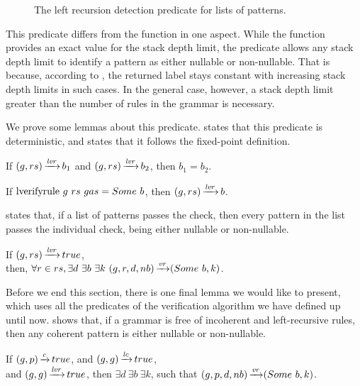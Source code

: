 \begin{figure}
    \centering
    
    \caption{The left recursion detection predicate for lists of patterns.}
    \label{fig:lverifyrule}
\end{figure}

This predicate differs from the function in one aspect.
While the function provides an exact value for the
stack depth limit, the predicate allows any stack depth limit
to identify a pattern as either nullable or non-nullable.
That is because, according to ,
the returned label stays constant with increasing stack depth limits in such cases.
In the general case, however,
a stack depth limit greater than
the number of rules in the grammar
is necessary.

We prove some lemmas about this predicate.
states that this predicate is deterministic,
and 
states that it follows the fixed-point definition.

\begin{lemma}
    If $(g,rs) \operatorname{\xrightarrow{\mathit{lvr}}} b_1$
    and $(g,rs) \operatorname{\xrightarrow{\mathit{lvr}}} b_2$,
    then $b_1 = b_2$.
    \label{lemma:lverifyrule-determinism}
\end{lemma}

\begin{lemma}
    If $\text{lverifyrule}{}\ g\ rs\ gas = Some\ b$,
    then $(g,rs) \operatorname{\xrightarrow{\mathit{lvr}}} b$.
    \label{lemma:lverifyrule-follows}
\end{lemma}

 states that,
if a list of patterns passes the check,
then every pattern in the list
passes the individual check,
being either nullable or non-nullable.

\begin{lemma}%
    If $(g,rs) \operatorname{\xrightarrow{\mathit{lvr}}} true$, \\
    then, $\forall r \in rs, \exists d\ \exists b\ \exists k\ \VerifyRule{g}{r}{d}{nb}{\Some b}{k}$.
    \label{lemma:lverifyrule-safety}
\end{lemma}

Before we end this section,
there is one final lemma we would like to present,
which uses all the predicates of the verification algorithm
we have defined up until now.
 shows that,
if a grammar is free of incoherent and left-recursive rules,
then any coherent pattern is either nullable or non-nullable.

\begin{lemma}%
    If $(g,p) \operatorname{\xrightarrow{\mathit{c}}} true$,
    and $(g,g) \operatorname{\xrightarrow{\mathit{lc}}} true$, \\
    and $(g,g) \operatorname{\xrightarrow{\mathit{lvr}}} true$,
    then $\exists d\ \exists b\ \exists k$,
    such that $(g,p,d,nb) \operatorname{\xrightarrow{\mathit{vr}}} (Some\ b,k)$.
    \label{lemma:no-lr-rule-in-grammar}
\end{lemma}
